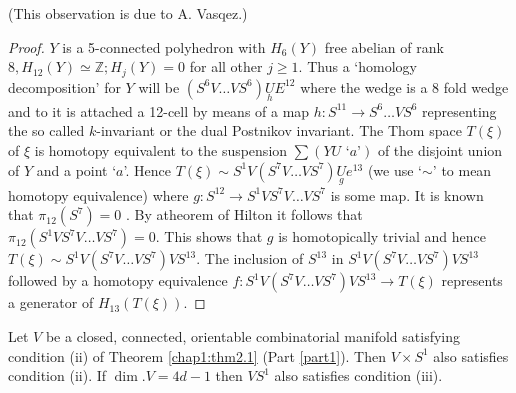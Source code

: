 (This observation is due to A. Vasqez.)

\begin{proof}
$Y$ is a 5-connected polyhedron with $H_6 (Y)$ free abelian of rank
  $8, H_{12} (Y) \simeq \mathbb{Z} ; H_j (Y) =0$ for all other $j \geq
  1$. Thus a `homology decomposition' \cite{c2:key2} for $Y$ will be $(S^6 V
  \ldots V S^6 ) \underset{h}{U} E^{12}$ where the wedge is a 8 fold wedge and to
  it is attached a 12-cell by means of a map $h : S^{11} \to S^6
  \ldots V S^6$ representing the so called $k$-invariant or the dual
  Postnikov invariant. The Thom space $T(\xi)$ of $\xi$ is homotopy
  equivalent to the suspension $\sum (Y U \text{ `$a$'})$ of the disjoint union
  of $Y$ and a point `$a$'. Hence $T(\xi) \sim  S^1 V ( S^7 V \ldots V S^7)
  \underset{g}{U} e^{13}$ (we use `$\sim$' to mean homotopy equivalence) where $g :
  S^{12} \to S^1 V S^7 V \ldots V S^7$ is some map. It is known that
  $\pi_{12} (S^7) = 0$ \cite{c2:key4}. By a\pageoriginale theorem of Hilton
  \cite{c2:key3} it follows that 
  $\pi_{12} (S^1 V S^7 V \ldots VS^7 ) =0$. This shows that $g$ is
  homotopically trivial and hence $T(\xi) \sim S^1 V (S^7 V \ldots
  VS^7)VS^{13}$. The inclusion of $S^{13}$ in $S^1 V(S^7 V \ldots
  VS^7) VS^{13}$ followed by a homotopy equivalence $f : S^1 V(S^7 V
  \ldots VS^7) VS^{13} \to T(\xi)$ represents a generator of $H_{13}
  (T(\xi))$. 
\end{proof}

\begin{lemma}\label{chap2:lem1.4} %
Let $V$  be a closed, connected, orientable combinatorial manifold
satisfying condition  (ii)  of Theorem \ref{chap1:thm2.1} (Part
\ref{part1}). Then $V \times 
S^1$ also satisfies condition (ii). If  $\dim. V = 4d -1$ then $V S^1$
also satisfies condition (iii). 
\end{lemma}

